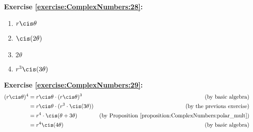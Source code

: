 \noindent\textbf{Exercise \ref{exercise:ComplexNumbers:28}:} %
\begin{multicols}{2}
\begin{enumerate}
\item
$r\cis\theta$

\item
$\cis(2\theta)$

\item
$2\theta$

\item
$r^{3}\cis(3\theta)$
\end{enumerate}
\end{multicols}

\noindent\textbf{Exercise \ref{exercise:ComplexNumbers:29}:} %
\begin{align*}
(r\cis\theta)^{4} &= r\cis\theta \cdot (r\cis\theta)^{3} &\text{(by basic algebra)}\\
&=  r\cis\theta \cdot (r^{3} \cdot \cis(3\theta)) &\text{(by the previous exercise)}\\
&=  r^{4} \cdot \cis( \theta +  3\theta) & \mbox{(by Proposition \ref{proposition:ComplexNumbers:polar_mult})}\\
&=   r^{4}\cis(4\theta) & \mbox{(by basic algebra)}
\end{align*}

